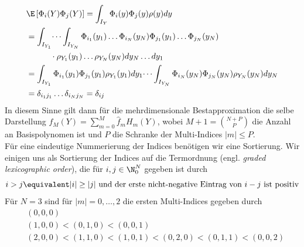 \begin{equation}
\label{eqn:gpc_ortho_mv}
\begin{split}
&\E\left[\Phi_i(Y)\Phi_j(Y)\right]=\int_{I_Y} \Phi_i(y)\Phi_j(y)\rho(y)dy\\
&=\int_{I_{Y_1}}\dots\int_{I_{Y_N}}\Phi_{i_1}(y_1)\dots\Phi_{i_N}(y_N)\Phi_{j_1}(y_1)\dots\Phi_{j_N}(y_N)\\
&\qquad\quad\cdot\rho_{Y_1}(y_1)\dots\rho_{Y_N}(y_N)dy_N\dots dy_1\\
&=\int_{I_{Y_1}}\Phi_{i_1}(y_1)\Phi_{j_1}(y_1)\rho_{Y_1}(y_1)dy_1\dots\int_{I_{Y_N}}\Phi_{i_N}(y_N)\Phi_{j_N}(y_N)\rho_{Y_N}(y_N)dy_N\\
&=\delta_{i_1j_1}\dots \delta_{i_Nj_N}=\delta_{ij}
\end{split}
\end{equation}
In diesem Sinne gilt dann für die mehrdimensionale Bestapproximation die selbe Darstellung $f_M(Y)=\sum_{m=0}^M\hat{f}_mH_m(Y)$, wobei $M+1=\binom{N+P}{P}$ die Anzahl an Basispolynomen ist und $P$ die Schranke der Multi-Indices $|m|\le P$.\\
Für eine eindeutige Nummerierung der Indices benötigen wir eine Sortierung. Wir einigen uns als Sortierung der Indices auf die Termordnung (engl. \emph{graded lexicographic order}), die für $i,j\in\N_0^N$ gegeben ist durch 
\[i>j \equivalent |i|\ge |j| \text{ und der erste nicht-negative Eintrag von } i-j \text { ist positiv}\]
Für $N=3$ sind für $|m|=0,\dots,2$ die ersten Multi-Indices gegeben durch
\begin{align*}
&(0,0,0)\\
&(1,0,0)<(0,1,0)<(0,0,1)\\
&(2,0,0)<(1,1,0)<(1,0,1)<(0,2,0)<(0,1,1)<(0,0,2)\\
\end{align*}
